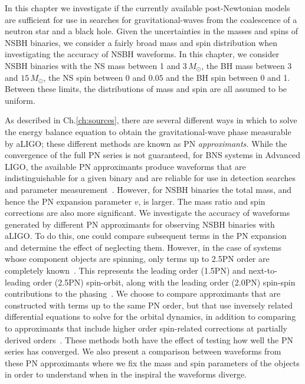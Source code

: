 In this chapter we investigate if the currently available post-Newtonian models
are sufficient for use in searches for gravitational-waves from the
coalescence of a neutron star and a black hole. Given the uncertainties in the masses and spins of
\ac{NSBH} binaries, we consider a fairly broad mass and spin
distribution when investigating the accuracy of \ac{NSBH} waveforms.
In this chapter, we consider \ac{NSBH} binaries with the \ac{NS} mass between 1
and $3\, M_\odot$, the \ac{BH} mass between $3$ and $15\, M_\odot$, the
\ac{NS} spin between 0 and $0.05$ and the
\ac{BH} spin between 0 and 1. Between these limits, the distributions of mass and spin are all
assumed to be uniform. 


As described in Ch.\ref{ch:sources}, there are several different ways in which to solve the energy balance equation
to obtain the gravitational-wave phase measurable by aLIGO; these different methods are known as
\ac{PN} \emph{approximants.} While the convergence of the full \ac{PN} series 
is not guaranteed, for \ac{BNS} systems in Advanced LIGO, the
available \ac{PN} approximants produce waveforms that are indistinguishable for
a given binary and are reliable for use in detection searches and parameter
measurement~\cite{Simone:1996db,Buonanno:2009zt,Brown:2012qf}. However, for \ac{NSBH}
binaries the total mass, and hence the \ac{PN} expansion parameter $v$, is
larger. The mass ratio and spin corrections are also more significant. 
We investigate the accuracy of 
waveforms generated by different \ac{PN} approximants for observing \ac{NSBH}
binaries with aLIGO.
To do this, one could compare subsequent terms in the \ac{PN} expansion and
determine the effect of neglecting them. However, in the case of systems whose
component objects are spinning, only terms up to 2.5\ac{PN} order are
completely known~\cite{Kidder:1992fr,Kidder:1995zr,Arun:2008kb}. 
This represents the leading order (1.5\ac{PN}) and
next-to-leading order (2.5\ac{PN}) spin-orbit, along with the leading order
(2.0\ac{PN}) spin-spin contributions to the phasing~\cite{Kidder:1992fr,Kidder:1995zr,Arun:2008kb}.  
We choose to compare approximants that are constructed with terms up to the same
\ac{PN} order, but that use inversely related differential equations to solve
for the orbital dynamics, in addition to comparing to approximants that include
higher order spin-related corrections at partially derived orders~\cite{Bohe:2013cla, Blanchet:2011zv}.
These methods both have the effect of testing
how well the \ac{PN} series has converged. We also present a comparison between
waveforms from these \ac{PN} approximants where we fix the mass and spin
parameters of the objects in order to understand when in the inspiral the waveforms diverge.

